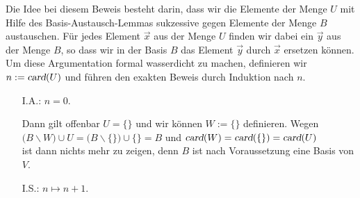 \proof
Die Idee bei diesem Beweis besteht darin, dass wir die Elemente der Menge $U$ mit Hilfe
des Basis-Austausch-Lemmas sukzessive gegen Elemente der Menge $B$ austauschen.  F\"{u}r jedes
Element $\vec{x}$ aus der Menge $U$ finden wir dabei ein $\vec{y}$ aus der Menge
$B$, so dass wir in der Basis $B$ das Element $\vec{y}$ durch $\vec{x}$ ersetzen k\"{o}nnen.
Um diese Argumentation formal wasserdicht zu machen, definieren wir $n :=
\textsl{card}(U)$ und f\"{u}hren 
den exakten Beweis durch Induktion nach $n$. 
\begin{enumerate}
\item[I.A.:] $n = 0$. 

             Dann gilt offenbar $U = \{\}$ und wir k\"{o}nnen $W := \{\}$ definieren.  Wegen
             \\[0.2cm]
             \hspace*{1.3cm}
             $\bigl(B \backslash W\bigr) \cup U = \bigl(B \backslash \{\}\bigr) \cup \{\} = B$ \quad und \quad
             $\textsl{card}(W) = \textsl{card}(\{\}) = \textsl{card}(U)$
             \\[0.2cm]
             ist dann nichts mehr zu zeigen, denn $B$ ist nach Voraussetzung eine Basis von $V$.
\item[I.S.:] $n \mapsto n+1$. 


\end{enumerate}
